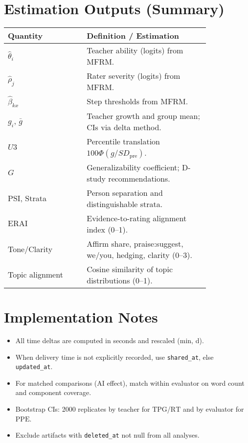 \documentclass[11pt]{article}
\newcommand{\TPG}{\mathrm{TPG}}
\newcommand{\PPE}{\mathrm{PPE}}
\newcommand{\RT}{\mathrm{RT}}
\newcommand{\ERAI}{\mathrm{ERAI}}
\newcommand{\PSI}{\mathrm{PSI}}
\begin{document}
\section{Estimation Outputs (Summary)}
\begin{longtable}{@{}p{0.32\linewidth}p{0.50\linewidth}@{}}
\toprule
\textbf{Quantity} & \textbf{Definition / Estimation} \\
\midrule
\endhead
$\widehat{\theta}_i$ & Teacher ability (logits) from MFRM. \\
$\widehat{\rho}_j$ & Rater severity (logits) from MFRM. \\
$\widehat{\beta}_{k x}$ & Step thresholds from MFRM. \\
$g_i$, $\bar{g}$ & Teacher growth and group mean; CIs via delta method. \\
$U3$ & Percentile translation $100\Phi(g/SD_{\mathrm{pre}})$. \\
$G$ & Generalizability coefficient; D-study recommendations. \\
$\PSI$, Strata & Person separation and distinguishable strata. \\
$\ERAI$ & Evidence-to-rating alignment index (0--1). \\
Tone/Clarity & Affirm share, praise:suggest, we/you, hedging, clarity (0--3). \\
Topic alignment & Cosine similarity of topic distributions (0--1). \\
\bottomrule
\end{longtable}

\section{Implementation Notes}
\begin{itemize}[leftmargin=2em]
  \item All time deltas are computed in seconds and rescaled (\si{\minute}, \si{\day}).
  \item When delivery time is not explicitly recorded, use \texttt{shared\_at}, else \texttt{updated\_at}.
  \item For matched comparisons (AI effect), match within evaluator on word count and component coverage.
  \item Bootstrap CIs: 2000 replicates by teacher for $\TPG$/$\RT$ and by evaluator for $\PPE$.
  \item Exclude artifacts with \texttt{deleted\_at} not null from all analyses.
\end{itemize}
\end{document}
